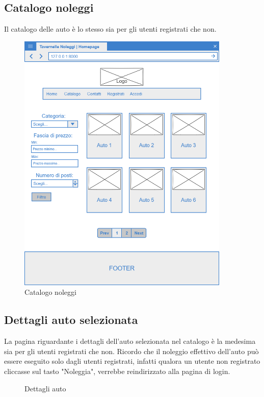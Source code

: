 \documentclass[12pt,a4paperS]{report}
\begin{document}
\begin{normalsize}
			\subsection{Catalogo noleggi}
				Il catalogo delle auto è lo stesso sia per gli utenti registrati che non.
				\newline
				\begin{figure}[H]
					\centering
					\includegraphics[width=0.9\textwidth, height=0.9\textheight, keepaspectratio]{Mockup/Catalogo.png}
					\caption{Catalogo noleggi}
				\end{figure}
			
			\subsection{Dettagli auto selezionata}
				La pagina riguardante i dettagli dell'auto selezionata nel catalogo è la medesima sia per gli utenti registrati che non.
				\newline
				Ricordo che il noleggio effettivo dell'auto può essere eseguito solo dagli utenti registrati, infatti qualora un utente non registrato cliccasse sul tasto "Noleggia", verrebbe reindirizzato alla pagina di login.
				\newline
				\begin{figure}[H]
					\centering
					\caption{Dettagli auto}
				\end{figure}
			

\end{normalsize}
\end{document}
